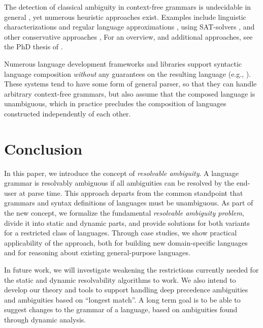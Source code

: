 \documentclass[acmsmall,review,anonymous]{acmart}\settopmatter{printfolios=true,printccs=false,printacmref=false}
\begin{document}
The detection of classical ambiguity in context-free grammars is undecidable in general \cite{cantorAmbiguityProblemBackus1962}, yet numerous heuristic approaches exist. Examples include linguistic characterizations and regular language approximations \cite{brabrandAnalyzingAmbiguityContextFree2007}, using SAT-solvers \cite{axelssonAnalyzingContextFreeGrammars2008}, and other conservative approaches \cite{schmitzConservativeAmbiguityDetection2007}, For an overview, and additional approaches, see the PhD thesis of \citet{bastenAmbiguityDetectionProgramming2011}.

Numerous language development frameworks and libraries support syntactic language composition \emph{without} any guarantees on the resulting language (e.g., \cite{heeringSyntaxDefinitionFormalism1989}). These systems tend to have some form of general parser, so that they can handle arbitrary context-free grammars, but also assume that the composed language is unambiguous, which in practice precludes the composition of languages constructed independently of each other.


\section{Conclusion}
In this paper, we introduce the concept of \emph{resolvable
  ambiguity}. A language grammar is resolvably ambiguous if all
ambiguities can be resolved by the end-user at parse time. This
approach departs from the common standpoint that grammars and
syntax definitions of languages must be unambiguous.
%
As part of the new concept, we formalize the fundamental
\emph{resolvable ambiguity problem}, divide it into static and
dynamic parts, and provide solutions for both variants for a
restricted class of languages. Through case studies, we show
practical applicability of the approach, both for building new
domain-specific languages and for reasoning about existing
general-purpose languages.

In future work, we will investigate weakening the restrictions
currently needed for the static and dynamic resolvability
algorithms to work. We also intend to develop our theory and tools
to support handling deep precedence ambiguities and ambiguities
based on ``longest match''. A long term goal is to be able to
suggest changes to the grammar of a language, based on ambiguities
found through dynamic analysis.


\end{document}
